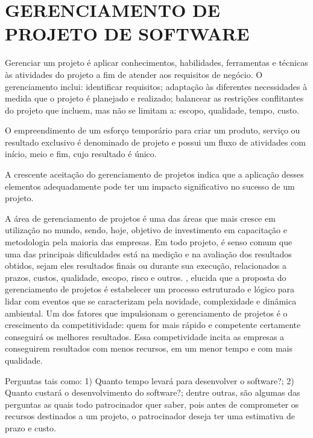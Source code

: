 \chapter*[GERENCIAMENTO DE PROJETO DE SOFTWARE]{GERENCIAMENTO DE PROJETO DE SOFTWARE}
Gerenciar um projeto é aplicar conhecimentos, habilidades, ferramentas e técnicas às atividades do projeto a fim de atender aos requisitos de negócio. O gerenciamento inclui: identificar requisitos; adaptação às diferentes necessidades à medida que o projeto é planejado e realizado; balancear as restrições conflitantes do projeto que incluem, mas não se limitam a: escopo, qualidade, tempo, custo. \cite{ansi1998}

O empreendimento de um esforço temporário para criar um produto, serviço ou resultado exclusivo é denominado de projeto e possui um fluxo de atividades com início, meio e fim, cujo resultado é único. \cite{pmbok}

A crescente aceitação do gerenciamento de projetos indica que a aplicação desses elementos adequadamente pode ter um impacto significativo no sucesso de um projeto. \cite{pmbok}

A área de gerenciamento de projetos é uma das áreas que mais cresce em utilização no mundo, sendo, hoje, objetivo de investimento em capacitação e metodologia pela maioria das empresas. Em todo projeto, é senso comum que uma das principais dificuldades está na medição e na avaliação dos resultados obtidos, sejam eles resultados finais ou durante sua execução, relacionados a prazos, custos, qualidade, escopo, risco e outros. \cite{vargas2011} , elucida que a proposta do gerenciamento de projetos é estabelecer um processo estruturado e lógico para lidar com eventos que se caracterizam pela novidade, complexidade e dinâmica ambiental. Um dos fatores que impulsionam o gerenciamento de projetos é o crescimento da competitividade: quem for mais rápido e competente certamente conseguirá os melhores resultados. Essa competividade incita as empresas a conseguirem resultados com menos recursos, em um menor tempo e com mais qualidade.

Perguntas tais como: 1) Quanto tempo levará para desenvolver o software?; 2) Quanto custará o desenvolvimento do software?; dentre outras, são algumas das perguntas as quais todo patrocinador quer saber, pois antes de comprometer os recursos destinados a um projeto, o patrocinador deseja ter uma estimativa de prazo e custo. \cite{pfleeger2004}

